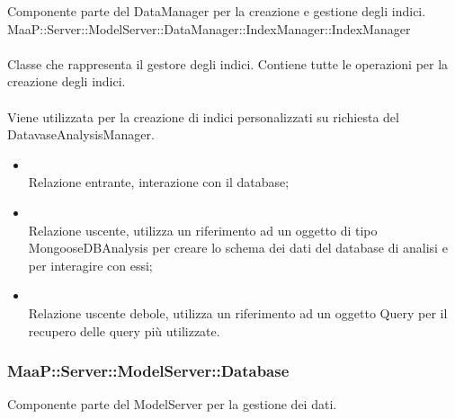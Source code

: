 Componente parte del DataManager per la creazione e gestione degli indici.
\\
MaaP::Server::ModelServer::DataManager::IndexManager::IndexManager\\
\\
Classe che rappresenta il gestore degli indici. Contiene tutte le operazioni per la creazione degli indici.\\
\\
Viene utilizzata per la creazione di indici personalizzati su richiesta del DatavaseAnalysisManager.\\
\begin{itemize}
\item{}\\
Relazione entrante, interazione con il database;
\item{}\\
Relazione uscente, utilizza un riferimento ad un oggetto di tipo MongooseDBAnalysis per creare lo schema dei dati del database di analisi e per interagire con essi;
\item{}\\
Relazione uscente debole, utilizza un riferimento ad un oggetto Query per il recupero delle query più utilizzate.
\end{itemize}

\subsubsection{MaaP::Server::ModelServer::Database}
Componente parte del ModelServer per la gestione dei dati.

